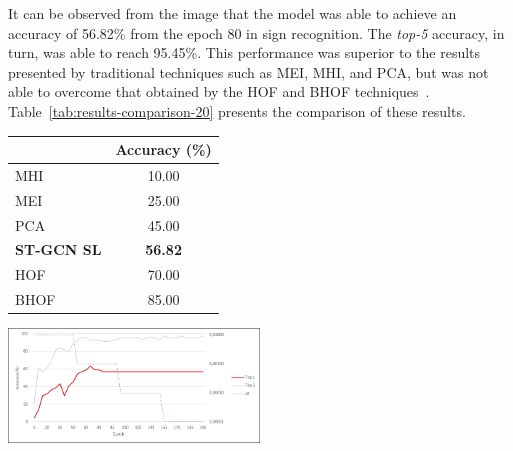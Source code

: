 It can be observed from the image that the model was able to achieve an accuracy of 56.82\% from the epoch 80 in sign recognition. The \textit{top-5} accuracy, in turn, was able to reach 95.45\%. This performance was superior to the results presented by traditional techniques such as MEI, MHI, and PCA, but was not able to overcome that obtained by the HOF and BHOF techniques~\cite{lim-2016}. Table~\ref{tab:results-comparison-20} presents the comparison of these results.

\begin{multicols}{2}


\begin{center}
\label{tab:results-comparison-20}
\begin{tabular}{lc}
\hline
                   & Accuracy (\%)  \\ \hline
MHI                & 10.00                     \\
MEI                & 25.00                     \\
PCA                & 45.00                     \\
\textbf{ST-GCN SL} & \textbf{56.82}            \\
HOF                & 70.00                     \\
BHOF               & 85.00                     \\ \hline
\end{tabular}
\end{center}


\columnbreak


    \begin{center}
    \includegraphics[width=0.5\textwidth]{images/results_20}
    \label{fig:training-asllvd-20}
    \end{center}


\end{multicols}

